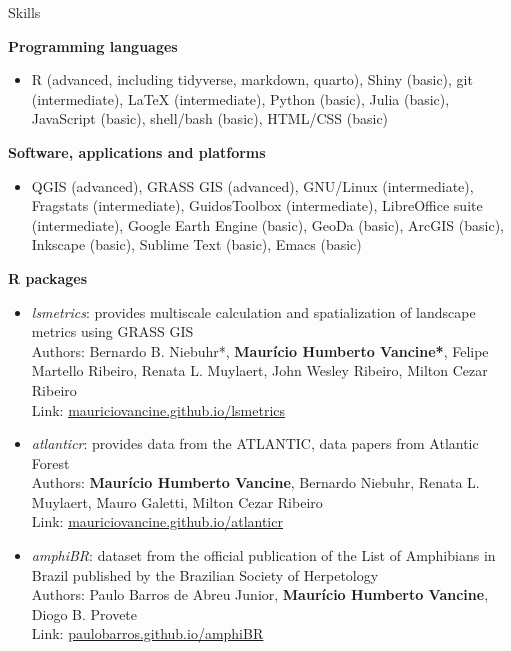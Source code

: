\documentclass{resume}
\begin{document}
\begin{rSection}{Skills}

{\bf Programming languages}
\begin{itemize}
\item R (advanced, including tidyverse, markdown, quarto), Shiny (basic), git (intermediate), LaTeX (intermediate), Python (basic), Julia (basic), JavaScript (basic), shell/bash (basic), HTML/CSS (basic)
\end{itemize}

{\bf Software, applications and platforms}
\begin{itemize}
\item QGIS (advanced), GRASS GIS (advanced), GNU/Linux (intermediate), Fragstats (intermediate), GuidosToolbox (intermediate), LibreOffice suite (intermediate), Google Earth Engine (basic), GeoDa (basic), ArcGIS (basic), Inkscape (basic), Sublime Text (basic), Emacs (basic)
\end{itemize}

{\bf R packages}
\begin{itemize} 
\item {\it lsmetrics}: provides multiscale calculation and spatialization of landscape metrics using GRASS GIS\\
Authors: Bernardo B. Niebuhr*, {\bf Maurício Humberto Vancine*}, Felipe Martello Ribeiro, Renata L. Muylaert, John Wesley Ribeiro, Milton Cezar Ribeiro\\
Link: \href{https://mauriciovancine.github.io/lsmetrics}{\underline{mauriciovancine.github.io/lsmetrics}}

\item {\it atlanticr}: provides data from the ATLANTIC, data papers from Atlantic Forest\\
Authors: {\bf Maurício Humberto Vancine}, Bernardo Niebuhr, Renata L. Muylaert, Mauro Galetti, Milton Cezar Ribeiro\\
Link: \href{https://mauriciovancine.github.io/atlanticr}{\underline{mauriciovancine.github.io/atlanticr}}

\item {\it amphiBR}: dataset from the official publication of the List of Amphibians in Brazil published by the Brazilian Society of Herpetology\\
Authors: Paulo Barros de Abreu Junior, {\bf Maurício Humberto Vancine}, Diogo B. Provete\\
Link: \href{https://paulobarros.github.io/amphiBR}{\underline{paulobarros.github.io/amphiBR}}


\end{itemize}
\end{rSection}
\end{document}
